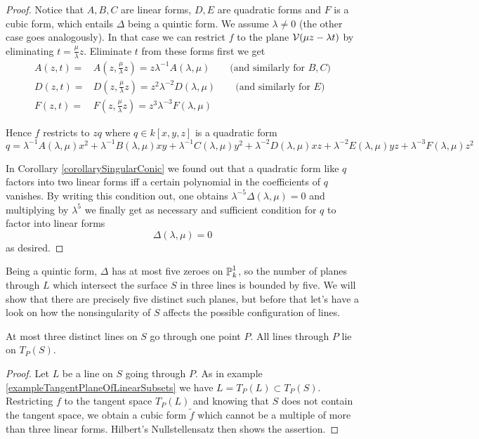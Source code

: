 \begin{proof}
Notice that $A,B,C$ are linear forms, $D,E$ are quadratic forms and $F$ is a cubic form, which entails $\Delta$ being a quintic form.
We assume $\lambda \neq 0$ (the other case goes analogously).
In that case we can restrict $f$ to the plane $\operatorname{\mathcal V}(\mu z - \lambda t)$ by eliminating $t = \frac\mu\lambda z$.
Eliminate $t$ from these forms first we get
\begin{align}
A(z,t) =& A(z,\frac\mu\lambda z) = z\lambda^{-1} A(\lambda,\mu) \qquad \text{(and similarly for $B,C$)} \\
D(z,t) =& D(z,\frac\mu\lambda z) = z^2\lambda^{-2} D(\lambda,\mu) \qquad \text{(and similarly for $E$)} \\
F(z,t) =& F(z,\frac\mu\lambda z) = z^3\lambda^{-3} F(\lambda,\mu)
\end{align}

Hence $f$ restricts to $zq$ where $q \in k[x,y,z]$ is a quadratic form
\begin{equation}
q =
\lambda^{-1} A(\lambda,\mu) x^2
+\lambda^{-1} B(\lambda,\mu) xy
+\lambda^{-1} C(\lambda,\mu) y^2
+\lambda^{-2} D(\lambda,\mu) xz
+\lambda^{-2} E(\lambda,\mu) yz
+\lambda^{-3} F(\lambda,\mu) z^2
\end{equation}

In Corollary \ref{corollarySingularConic} we found out that a quadratic form like $q$ factors into two linear forms iff a certain polynomial in the coefficients of $q$ vanishes.
By writing this condition out, one obtains $\lambda^{-5} \Delta(\lambda,\mu) = 0$ and multiplying by $\lambda^5$ we finally get as necessary and sufficient condition for $q$ to factor into linear forms
\begin{equation}
\Delta(\lambda,\mu) = 0
\end{equation}
as desired.
\end{proof}

Being a quintic form, $\Delta$ has at most five zeroes on $\operatorname{\mathbb P}^1_k$, so the number of planes through $L$ which intersect the surface $S$ in three lines is bounded by five.
We will show that there are precisely five distinct such planes, but before that let's have a look on how the nonsingularity of $S$ affects the possible configuration of lines.

\begin{lemma}  \label{lemmaCoplanarLinesOnCubic}
At most three distinct lines on $S$ go through one point $P$.
All lines through $P$ lie on $T_P(S)$.
\end{lemma}
\begin{proof}
Let $L$ be a line on $S$ going through $P$.
As in example \ref{exampleTangentPlaneOfLinearSubsets} we have $L = T_P(L) \subset T_P(S)$.
Restricting $f$ to the tangent space $T_P(L)$ and knowing that $S$ does not contain the tangent space, we obtain a cubic form $\widetilde f$ which cannot be a multiple of more than three linear forms.
Hilbert's Nullstellensatz then shows the assertion.
\end{proof}

